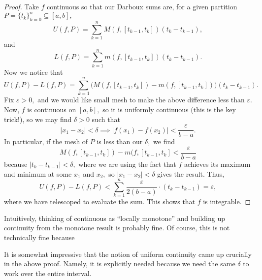 \documentclass[../notes.tex]{subfiles}
\begin{document}
\begin{proof}
	Take $f$ continuous so that our Darboux sums are, for a given partition $P=\{t_k\}_{k=0}^n\subseteq[a,b],$
	\[U(f,P)=\sum_{k=1}^nM(f,[t_{k-1},t_k])(t_k-t_{k-1}),\]
	and
	\[L(f,P)=\sum_{k=1}^nm(f,[t_{k-1},t_k])(t_k-t_{k-1}).\]
	Now we notice that
	\[U(f,P)-L(f,P)=\sum_{k=1}^n\big(M(f,[t_{k-1},t_k])-m(f,[t_{k-1},t_k])\big)(t_k-t_{k-1}).\]
	Fix $\varepsilon>0,$ and we would like small mesh to make the above difference less than $\varepsilon.$ Now, $f$ is continuous on $[a,b],$ so it is uniformly continuous (this is the key trick!), so we may find $\delta>0$ such that
	\[|x_1-x_2|<\delta\implies|f(x_1)-f(x_2)|<\frac{\varepsilon}{b-a}.\]
	In particular, if the mesh of $P$ is less than our $\delta,$ we find
	\[M(f,[t_{k-1},t_k])-m(f,[t_{k-1},t_k]<\frac{\varepsilon}{b-a}\]
	because $|t_k-t_{k-1}|<\delta,$ where we are using the fact that $f$ achieves its maximum and minimum at some $x_1$ and $x_2,$ so $|x_1-x_2|<\delta$ gives the result. Thus,
	\[U(f,P)-L(f,P)<\sum_{k=1}^n\frac{\varepsilon}{2(b-a)}\cdot(t_k-t_{k-1})=\varepsilon,\]
	where we have telescoped to evaluate the sum. This shows that $f$ is integrable.
\end{proof}
\begin{remark}
	Intuitively, thinking of continuous as ``locally monotone'' and building up continuity from the monotone result is probably fine. Of course, this is not technically fine because 
\end{remark}
\begin{remark}
	It is somewhat impressive that the notion of uniform continuity came up crucially in the above proof. Namely, it is explicitly needed because we need the same $\delta$ to work over the entire interval.
\end{remark}
\end{document}
